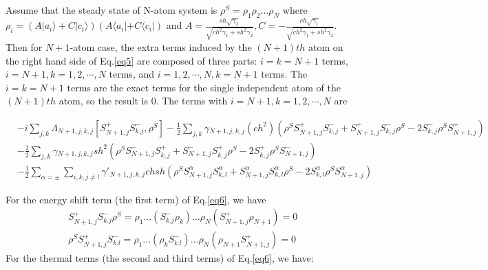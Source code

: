\documentclass[aps,showpacs,twocolumn,twoside,groupedaddress]{revtex4}
\begin{document}
Assume that the steady state of N-atom system is $\rho^{S}=\rho_{1}\rho_{2}...\rho_{N}$ where $\rho_{i}=(A|a_{i}\rangle+C|c_{i}\rangle)(A\langle a_{i}|+C\langle c_{i}|)$ and $A=\frac{sh\sqrt{\gamma_{2}}}{\sqrt{ch^{2}\gamma_{1}+sh^{2}\gamma_{2}}}, C=-\frac{ch\sqrt{\gamma_{1}}}{\sqrt{ch^{2}\gamma_{1}+sh^{2}\gamma_{2}}}$. Then for $N+1$-atom case, the extra terms induced by the $(N+1)th$ atom on the right hand side of Eq.\eqref{eq5} are composed of three parts: $i=k=N+1$ terms, $i=N+1, k=1,2,\cdots,N$ terms, and $i=1,2,\cdots,N, k=N+1$ terms. The $i=k=N+1$ terms are the exact terms for the single independent atom of the $(N+1)th$ atom, so the result is 0. The terms with $i=N+1, k=1,2,\cdots, N$ are 
\begin{widetext}
\begin{equation}
\label{eq6}
\begin{split}
&-i\underset{j,k}{\sum}\Lambda_{N+1,j,k,j}[S_{N+1,j}^{+}S_{k.j}^{-},\rho^{S}] 
-\frac{1}{2}\underset{j,k}{\sum}\gamma{}_{N+1,j,k,j}(ch^{2})(\rho^{S}S_{N+1,j}^{+}S_{k,j}^{-}+S_{N+1,j}^{+}S_{k,j}^{-}\rho^{S}-2S_{k,j}^{-}\rho^{S}S_{N+1,j}^{+})\\
&-\frac{1}{2}\underset{j,k}{\sum}\gamma{}_{N+1,j,k,j}sh^{2}(\rho^{S}S_{N+1,j}^{-}S_{k,j}^{+}+S_{N+1,j}^{-}S_{k,j}^{+}\rho^{S}-2S_{k,j}^{+}\rho^{S}S_{N+1,j}^{-}) \\
&-\frac{1}{2}\sum_{\alpha=\pm}\underset{i,k,j\ne l}{\sum}\gamma'_{N+1,j,k,j}chsh(\rho^{S}S_{N+1,j}^{\alpha}S_{k,l}^{\alpha}+S_{N+1,j}^{\alpha}S_{k,l}^{\alpha}\rho^{S}-2S_{k,l}^{\alpha}\rho^{S}S_{N+1,j}^{\alpha})
\end{split}
\end{equation}
\end{widetext}
For the energy shift term (the first term) of Eq.\eqref{eq6}, we have 
\begin{equation}
\label{eq7}
\begin{split}
&S_{N+1,j}^{+}S_{k.j}^{-}\rho^{S}=\rho_{1}...(S_{k.j}^{-}\rho_{k})...\rho_{N}(S_{N+1,j}^{+}\rho_{N+1})=0\\
&\rho^{S}S_{N+1,j}^{+}S_{k.l}^{-}=\rho_{1}...(\rho_{k}S_{k.l}^{-})...\rho_{N}(\rho_{N+1}S_{N+1,j}^{+})=0
\end{split}
\end{equation}
For the thermal terms (the second and third terms) of Eq.\eqref{eq6}, we have:
\end{document}

